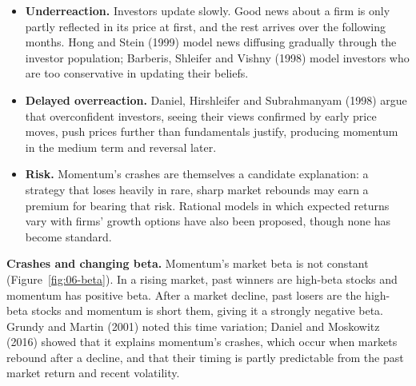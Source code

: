 \begin{itemize}
  \item \textbf{Underreaction.} Investors update slowly. Good news about a firm is only partly reflected in its price at first, and the rest arrives over the following months. Hong and Stein (1999) model news diffusing gradually through the investor population; Barberis, Shleifer and Vishny (1998) model investors who are too conservative in updating their beliefs.
  \item \textbf{Delayed overreaction.} Daniel, Hirshleifer and Subrahmanyam (1998) argue that overconfident investors, seeing their views confirmed by early price moves, push prices further than fundamentals justify, producing momentum in the medium term and reversal later.
  \item \textbf{Risk.} Momentum's crashes are themselves a candidate explanation: a strategy that loses heavily in rare, sharp market rebounds may earn a premium for bearing that risk. Rational models in which expected returns vary with firms' growth options have also been proposed, though none has become standard.
\end{itemize}

\textbf{Crashes and changing beta.} Momentum's market beta is not constant (Figure~\ref{fig:06-beta}). In a rising market, past winners are high-beta stocks and momentum has positive beta. After a market decline, past losers are the high-beta stocks and momentum is short them, giving it a strongly negative beta. Grundy and Martin (2001) noted this time variation; Daniel and Moskowitz (2016) showed that it explains momentum's crashes, which occur when markets rebound after a decline, and that their timing is partly predictable from the past market return and recent volatility.

